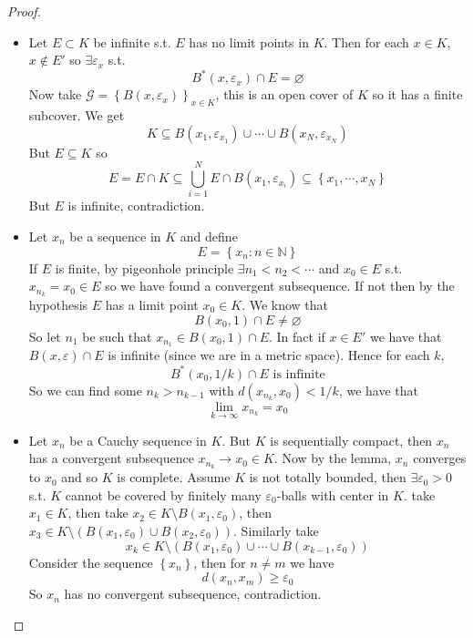 \documentclass[11pt,a4paper]{article}
\theoremstyle{definition}
\theoremstyle{plain}
\theoremstyle{remark}
\newcommand{\N}{\mathbb{N}}
\renewcommand{\set}[1]{\left\{ #1 \right\}}
\newcommand{\1}{\mathbbm{1}}
\begin{document}
\begin{proof}
    \begin{itemize}
        \item[$(i) \implies (ii)$] Let $E \subset K$ be infinite s.t. $E$ has no limit points in $K$. Then for each $x \in K$, $x \not\in E'$ so $\exists \varepsilon_x$ s.t. 
        $$B^*(x, \varepsilon_x) \cap E = \varnothing$$
        Now take $\mathcal{G} = \set{B(x, \varepsilon_x)}_{x \in K}$, this is an open cover of $K$ so it has a finite subcover. We get 
        $$K \subseteq B(x_1, \varepsilon_{x_1}) \cup \cdots \cup B(x_N, \varepsilon_{x_N})$$
        But $E \subseteq K$ so 
        $$E = E \cap K \subseteq \bigcup_{i=1}^N  E \cap B(x_1, \varepsilon_{x_i}) \subseteq \set{x_1, \cdots, x_N}$$
        But $E$ is infinite, contradiction.

        \item[$(ii) \implies (iii)$] Let $x_n$ be a sequence in $K$ and define 
        $$E = \set{x_n\colon n \in \N}$$
        If $E$ is finite, by pigeonhole principle $\exists n_1 < n_2 < \cdots$ and $x_0 \in E$ s.t. $x_{n_k} = x_0 \in E$ so we have found a convergent subsequence. If not then by the hypothesis $E$ has a limit point $x_0 \in K$.
        We know that 
        $$B(x_0, 1) \cap E \ne \varnothing$$
        So let $n_1$ be such that $x_{n_1} \in B(x_0, 1) \cap E$. In fact if $x \in E'$ we have that $B(x, \varepsilon) \cap E$ is infinite (since we are in a metric space). Hence for each $k$, 
        $$B^*(x_0, 1/k) \cap E \text{ is infinite}$$
        So we can find some $n_k > n_{k-1}$ with $d(x_{n_k}, x_0) < 1/k$, we have that 
        $$\lim_{k \to \infty} x_{n_k} = x_0$$  

        \item[$(iii) \implies (iv)$] Let $x_n$ be a Cauchy sequence in $K$. But $K$ is sequentially compact, then $x_n$ has a convergent subsequence $x_{n_k} \to x_0 \in K$. 
        Now by the lemma, $x_n$ converges to $x_0$ and so $K$ is complete. Assume $K$ is not totally bounded, then $\exists \varepsilon_0 > 0$ s.t. $K$ cannot be covered by finitely many $\varepsilon_0$-balls with center in $K$. 
        take $x_1 \in K$, then take $x_2 \in K \setminus B(x_1, \varepsilon_0)$, then $x_3 \in K \setminus (B(x_1, \varepsilon_0) \cup B(x_2, \varepsilon_0))$. Similarly take 
        $$x_k \in K \setminus \left(B(x_1, \varepsilon_0) \cup \cdots \cup B(x_{k-1}, \varepsilon_0)\right)$$
        Consider the sequence $\set{x_n}$, then for $n \ne m$ we have 
        $$d(x_n, x_m) \ge \varepsilon_0$$
        So $x_n$ has no convergent subsequence, contradiction.  


\end{itemize}
\end{proof}
\end{document}
